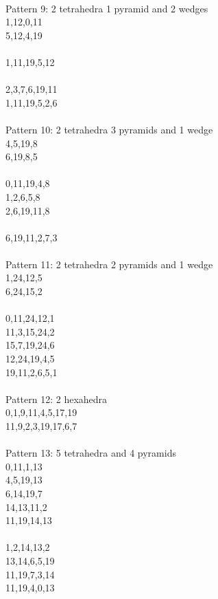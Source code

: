 \documentclass[twocolumn]{article}
\begin{document}
 \\
\tiny Pattern 9: 2 tetrahedra 1 pyramid and 2 wedges \\ 
        \tiny 1,12,0,11\\
        \tiny 5,12,4,19\\
        \tiny \\
        \tiny 1,11,19,5,12 \\
        \tiny \\
        \tiny 2,3,7,6,19,11 \\
        \tiny 1,11,19,5,2,6 \\


 \\
\tiny Pattern 10: 2 tetrahedra 3 pyramids and 1 wedge \\
\tiny 4,5,19,8 \\
\tiny 6,19,8,5 \\
\tiny \\
\tiny 0,11,19,4,8\\
\tiny 1,2,6,5,8\\
\tiny 2,6,19,11,8\\
\tiny \\
\tiny 6,19,11,2,7,3\\


 \\
\tiny Pattern 11: 2 tetrahedra 2 pyramids and 1 wedge \\
\tiny 1,24,12,5 \\
\tiny 6,24,15,2 \\
\tiny  \\
\tiny 0,11,24,12,1 \\
\tiny 11,3,15,24,2 \\
\tiny 15,7,19,24,6 \\
\tiny 12,24,19,4,5 \\
\tiny 19,11,2,6,5,1 \\

 \\
\tiny Pattern 12: 2 hexahedra \\
\tiny 0,1,9,11,4,5,17,19 \\
\tiny 11,9,2,3,19,17,6,7 \\

 \\
\tiny Pattern 13: 5 tetrahedra and 4 pyramids \\
\tiny 0,11,1,13 \\
\tiny 4,5,19,13 \\
\tiny  6,14,19,7 \\
\tiny  14,13,11,2 \\
\tiny  11,19,14,13\\
\tiny    \\
\tiny  1,2,14,13,2 \\
\tiny  13,14,6,5,19 \\
\tiny  11,19,7,3,14 \\
\tiny  11,19,4,0,13 \\
\end{document}

